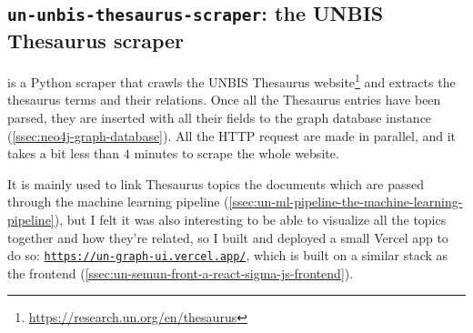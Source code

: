 
\subsection{\texttt{un-unbis-thesaurus-scraper}: the UNBIS Thesaurus scraper} \label{ssec:un-unbis-thesaurus-scraper-the-unbis-thesaurus-scraper}

 is a Python scraper that crawls the UNBIS Thesaurus website\footnote{\url{https://research.un.org/en/thesaurus}} and extracts the thesaurus terms and their relations. Once all the Thesaurus entries have been parsed, they are inserted with all their fields to the graph database instance (\ref{ssec:neo4j-graph-database}). All the HTTP request are made in parallel, and it takes a bit less than $4$ minutes to scrape the whole website.

It is mainly used to link Thesaurus topics the documents which are passed through the machine learning pipeline (\ref{ssec:un-ml-pipeline-the-machine-learning-pipeline}), but I felt it was also interesting to be able to visualize all the topics together and how they're related, so I built and deployed a small Vercel app to do so: \href{https://un-graph-ui.vercel.app/}{\faCloud{} \texttt{https://un-graph-ui.vercel.app/}}, which is built on a similar stack as the frontend (\ref{ssec:un-semun-front-a-react-sigma-js-frontend}).
